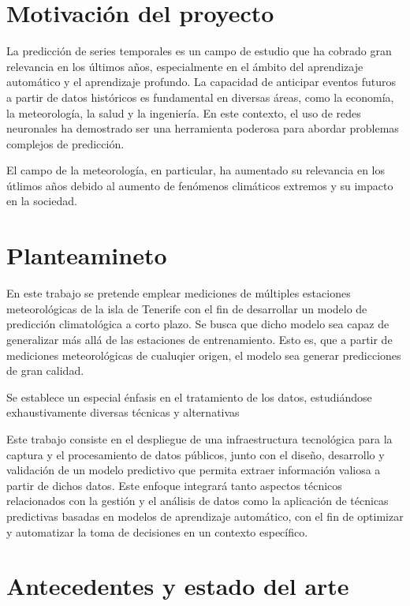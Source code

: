 \section{Motivación del proyecto}
La predicción de series temporales es un campo de estudio que ha cobrado gran relevancia en los últimos años, especialmente en el ámbito del aprendizaje automático y el aprendizaje profundo. 
La capacidad de anticipar eventos futuros a partir de datos históricos es fundamental en diversas áreas, como la economía, la meteorología, la salud y la ingeniería. 
En este contexto, el uso de redes neuronales ha demostrado ser una herramienta poderosa para abordar problemas complejos de predicción.

El campo de la meteorología, en particular, ha aumentado su relevancia en los útlimos años debido al aumento de fenómenos climáticos extremos y su impacto en la sociedad.

\section{Planteamineto}
En este trabajo se pretende emplear mediciones de múltiples estaciones meteorológicas de la isla de Tenerife con el fin de desarrollar un modelo de predicción climatológica a corto plazo.
Se busca que dicho modelo sea capaz de generalizar más allá de las estaciones de entrenamiento. Esto es, que a partir de mediciones meteorológicas de cualuqier origen, el modelo sea generar predicciones de gran calidad.

Se establece un especial énfasis en el tratamiento de los datos, estudiándose exhaustivamente diversas técnicas y alternativas

Este trabajo consiste en el despliegue de una infraestructura tecnológica para la captura y el procesamiento de datos públicos, 
junto con el diseño, desarrollo y validación de un modelo predictivo que permita extraer información valiosa a partir de dichos datos.
Este enfoque integrará tanto aspectos técnicos relacionados con la gestión y el análisis de datos como la aplicación de técnicas predictivas
basadas en modelos de aprendizaje automático, con el fin de optimizar y automatizar la toma de decisiones en un contexto específico.

\section{Antecedentes y estado del arte}

